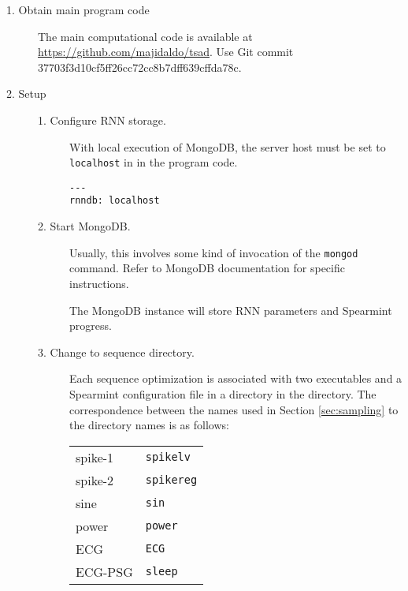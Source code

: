 \begin{description}
\item[1. Obtain main program code] \hfill

  The main computational code is available at \url{https://github.com/majidaldo/tsad}.
  Use \textsf{Git} commit 37703f3d10cf5ff26cc72cc8b7dff639cffda78c.
  


\item[2. Setup] \hfill

  \begin{description}

  \item[1. Configure RNN storage.] \hfill

    With local execution of \textsf{MongoDB}, the server host must be set to \texttt{localhost} in  in the program code.

\begin{verbatim}
---
rnndb: localhost
\end{verbatim}


  \item[2. Start \textsf{MongoDB}.] \hfill
    
    Usually, this involves some kind of invocation of the \texttt{mongod} command.
    Refer to \textsf{MongoDB} documentation for specific instructions.

    The \textsf{MongoDB} instance will store RNN parameters and \textsf{Spearmint} progress.


  \item[3. Change to sequence directory.] \hfill

    Each sequence optimization is associated with two executables and a \textsf{Spearmint} configuration file in a directory in the  directory.
    The correspondence between the names used in Section \ref{sec:sampling} to the directory names is as follows:
    
    \begin{tabular}{ll}
      spike-1 & \texttt{spikelv} \\
      spike-2 & \texttt{spikereg} \\
      sine    & \texttt{sin} \\
      power   & \texttt{power} \\
      ECG     & \texttt{ECG} \\
      ECG-PSG & \texttt{sleep} \\
    \end{tabular}



\end{description}
\end{description}
